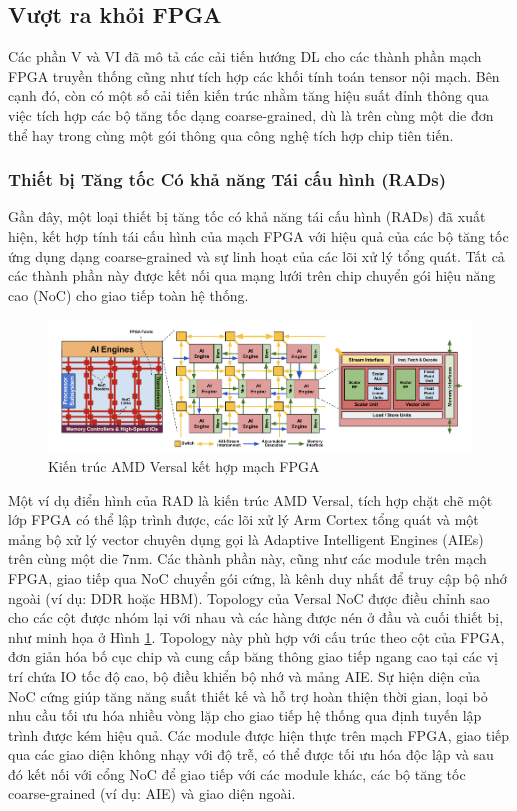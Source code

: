 \documentclass[a4paper]{article}
\begin{document}
\subsection{Vượt ra khỏi FPGA}
Các phần V và VI đã mô tả các cải tiến hướng DL cho các thành phần mạch FPGA truyền thống cũng như tích hợp các khối tính toán tensor nội mạch. Bên cạnh đó, còn có một số cải tiến kiến trúc nhằm tăng hiệu suất đỉnh thông qua việc tích hợp các bộ tăng tốc dạng coarse-grained, dù là trên cùng một die đơn thể hay trong cùng một gói thông qua công nghệ tích hợp chip tiên tiến.

\subsubsection{Thiết bị Tăng tốc Có khả năng Tái cấu hình (RADs)}
Gần đây, một loại thiết bị tăng tốc có khả năng tái cấu hình (RADs) đã xuất hiện, kết hợp tính tái cấu hình của mạch FPGA với hiệu quả của các bộ tăng tốc ứng dụng dạng coarse-grained và sự linh hoạt của các lõi xử lý tổng quát. Tất cả các thành phần này được kết nối qua mạng lưới trên chip chuyển gói hiệu năng cao (NoC) cho giao tiếp toàn hệ thống.

\begin{figure} [!h]
    \centering
    \includegraphics[width=1\linewidth]{assets/fpga_21.png}
    \caption{Kiến trúc AMD Versal kết hợp mạch FPGA}
    \label{fig:fpga_21}
\end{figure}

Một ví dụ điển hình của RAD là kiến trúc AMD Versal, tích hợp chặt chẽ một lớp FPGA có thể lập trình được, các lõi xử lý Arm Cortex tổng quát và một mảng bộ xử lý vector chuyên dụng gọi là Adaptive Intelligent Engines (AIEs) trên cùng một die 7nm. Các thành phần này, cũng như các module trên mạch FPGA, giao tiếp qua NoC chuyển gói cứng, là kênh duy nhất để truy cập bộ nhớ ngoài (ví dụ: DDR hoặc HBM). Topology của Versal NoC được điều chỉnh sao cho các cột được nhóm lại với nhau và các hàng được nén ở đầu và cuối thiết bị, như minh họa ở Hình \ref{fig:fpga_21}. Topology này phù hợp với cấu trúc theo cột của FPGA, đơn giản hóa bố cục chip và cung cấp băng thông giao tiếp ngang cao tại các vị trí chứa IO tốc độ cao, bộ điều khiển bộ nhớ và mảng AIE. Sự hiện diện của NoC cứng giúp tăng năng suất thiết kế và hỗ trợ hoàn thiện thời gian, loại bỏ nhu cầu tối ưu hóa nhiều vòng lặp cho giao tiếp hệ thống qua định tuyến lập trình được kém hiệu quả. Các module được hiện thực trên mạch FPGA, giao tiếp qua các giao diện không nhạy với độ trễ, có thể được tối ưu hóa độc lập và sau đó kết nối với cổng NoC để giao tiếp với các module khác, các bộ tăng tốc coarse-grained (ví dụ: AIE) và giao diện ngoài.
\end{document}
